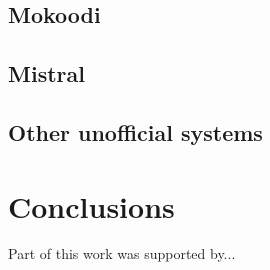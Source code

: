 \documentclass{aa}
\begin{document}
\subsection{Mokoodi}

\subsection{Mistral}

\subsection{Other unofficial systems}

\section{Conclusions}


\begin{acknowledgements}
      Part of this work was supported by...
\end{acknowledgements}

%
%



\end{document}
